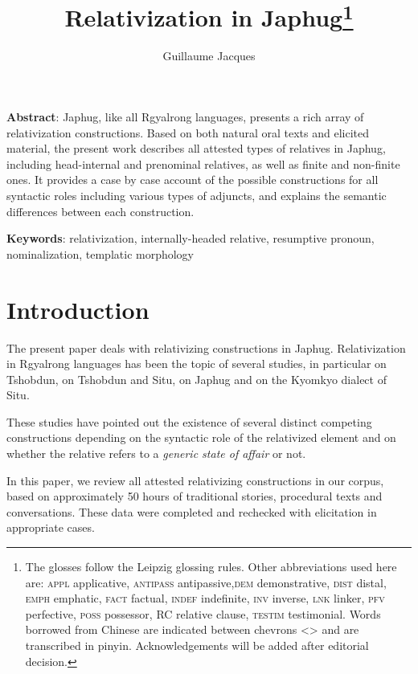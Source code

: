 \documentclass[oldfontcommands,oneside,a4paper,11pt]{article}
\begin{document}
 

\title{Relativization in Japhug\footnote{
The glosses follow the Leipzig glossing rules. Other abbreviations used here are: \textsc{appl} applicative, \textsc{antipass} antipassive,\textsc{dem} demonstrative, \textsc{dist} distal, \textsc{emph} emphatic, \textsc{fact} factual, \textsc{indef} indefinite, \textsc{inv} inverse,  \textsc{lnk} linker, \textsc{pfv} perfective, \textsc{poss} possessor, RC relative clause, \textsc{testim} testimonial. Words borrowed from Chinese are indicated between chevrons <> and are transcribed in pinyin. %
Acknowledgements will be added after editorial decision. %
} }
\author{Guillaume Jacques}
\maketitle
\linenumbers
\textbf{Abstract}: Japhug, like all Rgyalrong languages, presents a rich array of relativization constructions. Based on both natural oral texts and elicited material, the present work  describes all attested types of relatives in Japhug, including head-internal and prenominal relatives, as well as finite and non-finite ones. It provides a case by case account of the possible constructions for all syntactic roles including various types of adjuncts, and explains the semantic differences between each construction.



\textbf{Keywords}: relativization, internally-headed relative, resumptive pronoun, nominalization, templatic morphology
\section{Introduction}
The present paper deals with relativizing constructions in Japhug. Relativization in Rgyalrong languages has been the topic of several studies, in particular    \citet{jackson06guanxiju} on Tshobdun,  \citet{jacksonlin07} on Tshobdun and Situ, \citet{jacques08} on Japhug and  \citet{prins11kyomkyo} on the Kyomkyo dialect of Situ.

These studies have pointed out the existence of several distinct competing constructions depending on the syntactic role of the relativized element and on whether the relative refers to a \textit{generic state of affair} or not.

In this paper, we review all attested relativizing constructions in our corpus, based on approximately 50 hours of traditional stories, procedural texts and conversations. These data were completed and rechecked with elicitation in appropriate cases. 
\end{document}
